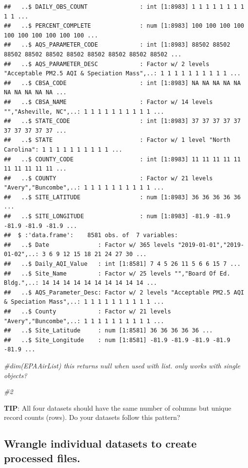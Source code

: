 \documentclass[
]{article}
\newenvironment{Shaded}{\begin{snugshade}}{\end{snugshade}}
\newcommand{\CommentTok}[1]{\textcolor[rgb]{0.56,0.35,0.01}{\textit{#1}}}
\begin{document}
\begin{verbatim}
##   ..$ DAILY_OBS_COUNT               : int [1:8983] 1 1 1 1 1 1 1 1 1 1 ...
##   ..$ PERCENT_COMPLETE              : num [1:8983] 100 100 100 100 100 100 100 100 100 100 ...
##   ..$ AQS_PARAMETER_CODE            : int [1:8983] 88502 88502 88502 88502 88502 88502 88502 88502 88502 88502 ...
##   ..$ AQS_PARAMETER_DESC            : Factor w/ 2 levels "Acceptable PM2.5 AQI & Speciation Mass",..: 1 1 1 1 1 1 1 1 1 1 ...
##   ..$ CBSA_CODE                     : int [1:8983] NA NA NA NA NA NA NA NA NA NA ...
##   ..$ CBSA_NAME                     : Factor w/ 14 levels "","Asheville, NC",..: 1 1 1 1 1 1 1 1 1 1 ...
##   ..$ STATE_CODE                    : int [1:8983] 37 37 37 37 37 37 37 37 37 37 ...
##   ..$ STATE                         : Factor w/ 1 level "North Carolina": 1 1 1 1 1 1 1 1 1 1 ...
##   ..$ COUNTY_CODE                   : int [1:8983] 11 11 11 11 11 11 11 11 11 11 ...
##   ..$ COUNTY                        : Factor w/ 21 levels "Avery","Buncombe",..: 1 1 1 1 1 1 1 1 1 1 ...
##   ..$ SITE_LATITUDE                 : num [1:8983] 36 36 36 36 36 ...
##   ..$ SITE_LONGITUDE                : num [1:8983] -81.9 -81.9 -81.9 -81.9 -81.9 ...
##  $ :'data.frame':    8581 obs. of  7 variables:
##   ..$ Date              : Factor w/ 365 levels "2019-01-01","2019-01-02",..: 3 6 9 12 15 18 21 24 27 30 ...
##   ..$ Daily_AQI_Value   : int [1:8581] 7 4 5 26 11 5 6 6 15 7 ...
##   ..$ Site_Name         : Factor w/ 25 levels "","Board Of Ed. Bldg.",..: 14 14 14 14 14 14 14 14 14 14 ...
##   ..$ AQS_Parameter_Desc: Factor w/ 2 levels "Acceptable PM2.5 AQI & Speciation Mass",..: 1 1 1 1 1 1 1 1 1 1 ...
##   ..$ County            : Factor w/ 21 levels "Avery","Buncombe",..: 1 1 1 1 1 1 1 1 1 1 ...
##   ..$ Site_Latitude     : num [1:8581] 36 36 36 36 36 ...
##   ..$ Site_Longitude    : num [1:8581] -81.9 -81.9 -81.9 -81.9 -81.9 ...
\end{verbatim}

\begin{Shaded}
\begin{Highlighting}[]
\CommentTok{\#dim(EPAAirList) this returns null when used with list. only works with single objects? }

\CommentTok{\#2 }
\end{Highlighting}
\end{Shaded}

\textbf{TIP}: All four datasets should have the same number of columns
but unique record counts (rows). Do your datasets follow this pattern?

\subsection{Wrangle individual datasets to create processed
files.}\label{wrangle-individual-datasets-to-create-processed-files.}
\end{document}
